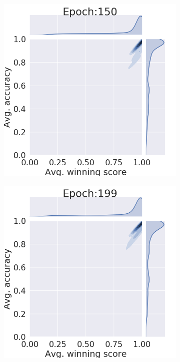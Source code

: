 \documentclass{article}
\begin{document}
\begin{figure}[htb]
\begin{subfigure}[b]{0.19\textwidth}
         \caption{}
     \end{subfigure}
          \centering
     \begin{subfigure}[b]{0.19\textwidth}
         \centering
         \noindent\includegraphics[width=\textwidth]{images/joint_plot/no_mixup/150.png}
         \caption{}
     \end{subfigure}
     \hfill
     \begin{subfigure}[b]{0.19\textwidth}
         \centering
         \noindent\includegraphics[width=\textwidth]{images/joint_plot/no_mixup/199.png}

\end{subfigure}
\end{figure}
\end{document}
